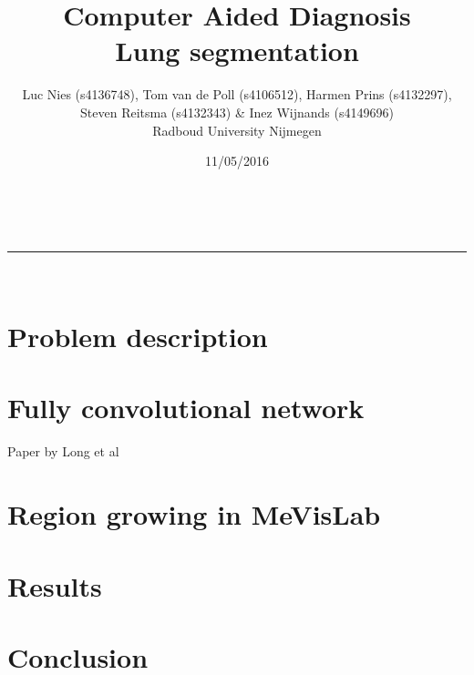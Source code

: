 \documentclass[a4paper,10pt]{article}
\makeatletter
\numberwithin{equation}{section} %
\numberwithin{figure}{section} %
\numberwithin{table}{section} %
\newcommand{\linia}{\rule{\linewidth}{0.5pt}}
\renewcommand{\maketitle}{
\begin{center}
\vspace{2ex}
{\huge \textsc{\@title}}
\vspace{1ex}
\\
\linia\\
\@author  \@date
\vspace{4ex}
\end{center}
}
\makeatother
\begin{document}
\title{Computer Aided Diagnosis \\\vspace{0.2cm} Lung segmentation}

\author{Luc Nies (s4136748), Tom van de Poll (s4106512), Harmen Prins (s4132297),\\ Steven Reitsma (s4132343) \& Inez Wijnands (s4149696)\\ Radboud University Nijmegen\\}

\date{11/05/2016}

\maketitle

\section{Problem description}

\section{Fully convolutional network}
Paper by Long et al \cite{long2015fully}

\section{Region growing in MeVisLab}

\section{Results}

\section{Conclusion}



\end{document}
